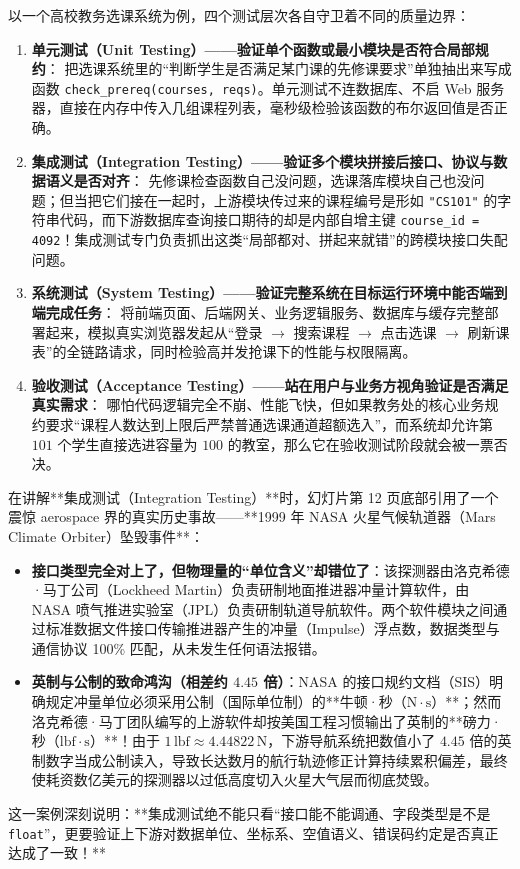 \documentclass[a4paper]{article}
\begin{document}
以一个高校教务选课系统为例，四个测试层次各自守卫着不同的质量边界：
\begin{enumerate}
    \item \textbf{单元测试（Unit Testing）——验证单个函数或最小模块是否符合局部规约}：
    把选课系统里的“判断学生是否满足某门课的先修课要求”单独抽出来写成函数 \texttt{check\_prereq(courses, reqs)}。单元测试不连数据库、不启 Web 服务器，直接在内存中传入几组课程列表，毫秒级检验该函数的布尔返回值是否正确。
    \item \textbf{集成测试（Integration Testing）——验证多个模块拼接后接口、协议与数据语义是否对齐}：
    先修课检查函数自己没问题，选课落库模块自己也没问题；但当把它们接在一起时，上游模块传过来的课程编号是形如 \texttt{"CS101"} 的字符串代码，而下游数据库查询接口期待的却是内部自增主键 \texttt{course\_id = 4092}！集成测试专门负责抓出这类“局部都对、拼起来就错”的跨模块接口失配问题。
    \item \textbf{系统测试（System Testing）——验证完整系统在目标运行环境中能否端到端完成任务}：
    将前端页面、后端网关、业务逻辑服务、数据库与缓存完整部署起来，模拟真实浏览器发起从“登录 $\to$ 搜索课程 $\to$ 点击选课 $\to$ 刷新课表”的全链路请求，同时检验高并发抢课下的性能与权限隔离。
    \item \textbf{验收测试（Acceptance Testing）——站在用户与业务方视角验证是否满足真实需求}：
    哪怕代码逻辑完全不崩、性能飞快，但如果教务处的核心业务规约要求“课程人数达到上限后严禁普通选课通道超额选入”，而系统却允许第 $101$ 个学生直接选进容量为 $100$ 的教室，那么它在验收测试阶段就会被一票否决。
\end{enumerate}

在讲解**集成测试（Integration Testing）**时，幻灯片第 12 页底部引用了一个震惊 aerospace 界的真实历史事故——**1999 年 NASA 火星气候轨道器（Mars Climate Orbiter）坠毁事件**：
\begin{itemize}
    \item \textbf{接口类型完全对上了，但物理量的“单位含义”却错位了}：该探测器由洛克希德·马丁公司（Lockheed Martin）负责研制地面推进器冲量计算软件，由 NASA 喷气推进实验室（JPL）负责研制轨道导航软件。两个软件模块之间通过标准数据文件接口传输推进器产生的冲量（Impulse）浮点数，数据类型与通信协议 100\% 匹配，从未发生任何语法报错。
    \item \textbf{英制与公制的致命鸿沟（相差约 $4.45$ 倍）}：NASA 的接口规约文档（SIS）明确规定冲量单位必须采用公制（国际单位制）的**牛顿·秒（$\mathrm{N\cdot s}$）**；然而洛克希德·马丁团队编写的上游软件却按美国工程习惯输出了英制的**磅力·秒（$\mathrm{lbf\cdot s}$）**！由于 $1\,\mathrm{lbf} \approx 4.44822\,\mathrm{N}$，下游导航系统把数值小了 $4.45$ 倍的英制数字当成公制读入，导致长达数月的航行轨迹修正计算持续累积偏差，最终使耗资数亿美元的探测器以过低高度切入火星大气层而彻底焚毁。
\end{itemize}
这一案例深刻说明：**集成测试绝不能只看“接口能不能调通、字段类型是不是 \texttt{float}”，更要验证上下游对数据单位、坐标系、空值语义、错误码约定是否真正达成了一致！**
\end{document}

